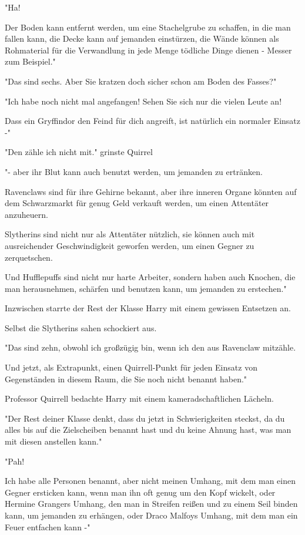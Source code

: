 {"Ha!

Der Boden kann entfernt werden, um eine Stachelgrube zu schaffen, in die man fallen kann, die Decke kann auf jemanden einstürzen, die Wände können als Rohmaterial für die Verwandlung in jede Menge tödliche Dinge dienen - Messer zum Beispiel."

"Das sind sechs. Aber Sie kratzen doch sicher schon am Boden des Fasses?"

"Ich habe noch nicht mal angefangen! Sehen Sie sich nur die vielen Leute an!

Dass ein Gryffindor den Feind für dich angreift, ist natürlich ein normaler Einsatz -"

"Den zähle ich nicht mit." grinste Quirrel

"- aber ihr Blut kann auch benutzt werden, um jemanden zu ertränken.

Ravenclaws sind für ihre Gehirne bekannt, aber ihre inneren Organe könnten auf dem Schwarzmarkt für genug Geld verkauft werden, um einen Attentäter anzuheuern.

Slytherins sind nicht nur als Attentäter nützlich, sie können auch mit ausreichender Geschwindigkeit geworfen werden, um einen Gegner zu zerquetschen.

Und Hufflepuffs sind nicht nur harte Arbeiter, sondern haben auch Knochen, die man herausnehmen, schärfen und benutzen kann, um jemanden zu erstechen."

Inzwischen starrte der Rest der Klasse Harry mit einem gewissen Entsetzen an.

Selbst die Slytherins sahen schockiert aus.

"Das sind zehn, obwohl ich großzügig bin, wenn ich den aus Ravenclaw mitzähle.

Und jetzt, als Extrapunkt, einen Quirrell-Punkt für jeden Einsatz von Gegenständen in diesem Raum, die Sie noch nicht benannt haben."

Professor Quirrell bedachte Harry mit einem kameradschaftlichen Lächeln.

"Der Rest deiner Klasse denkt, dass du jetzt in Schwierigkeiten steckst, da du alles bis auf die Zielscheiben benannt hast und du keine Ahnung hast, was man mit diesen anstellen kann."

"Pah!

Ich habe alle Personen benannt, aber nicht meinen Umhang, mit dem man einen Gegner ersticken kann, wenn man ihn oft genug um den Kopf wickelt, oder Hermine Grangers Umhang, den man in Streifen reißen und zu einem Seil binden kann, um jemanden zu erhängen, oder Draco Malfoys Umhang, mit dem man ein Feuer entfachen kann -"

}
